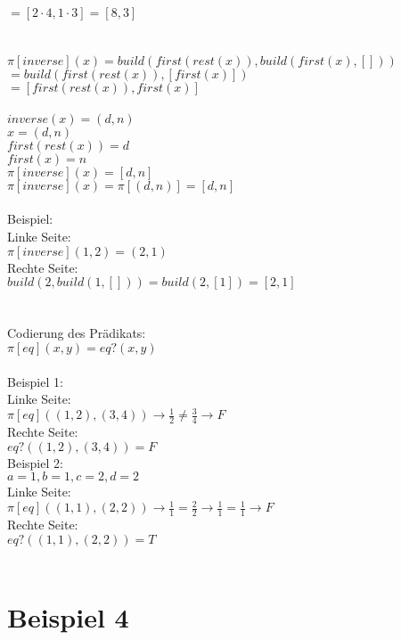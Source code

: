 \documentclass[12pt,runningheads,a4paper]{llncs}
\begin{document}
$= [2\cdot 4, 1 \cdot 3] = [8,3] $\\
\\
\\
$\pi[inverse](x) = build(first(rest(x)), build(first(x), []))$\\
$= build(first(rest(x)),[first(x)])$\\
$= [first(rest(x)), first(x)]$\\
\\
$inverse(x) = (d,n)$\\
$x = (d,n)$\\
$first(rest(x)) = d$\\
$first(x) = n$\\
$\pi [inverse](x) = [d,n]$\\
$\pi [inverse](x)= \pi [(d,n)] = [d,n]$\\
\\
Beispiel:\\
Linke Seite:\\
$\pi [inverse](1,2) = (2,1)$\\
Rechte Seite: \\
$build(2, build(1, [])) = build(2, [1]) = [2,1]$\\
\\
\\
Codierung des Prädikats:\\
$\pi[eq](x, y) = eq?(x, y)$\\
\\
Beispiel 1:\\
Linke Seite:\\
$\pi[eq]((1,2),(3,4)) \rightarrow \frac{1}{2} \neq \frac{3}{4} \rightarrow F$\\
Rechte Seite:\\
$eq?((1,2), (3,4)) = F$\\
Beispiel 2: \\
$a = 1, b = 1, c = 2, d = 2$\\
Linke Seite:\\
$\pi[eq]((1,1),(2,2)) \rightarrow \frac{1}{1} = \frac{2}{2} \rightarrow \frac{1}{1} = \frac{1}{1} \rightarrow F$\\
Rechte Seite:\\
$eq?((1,1), (2,2)) = T$\\
\\
\section*{Beispiel 4}
\end{document}
